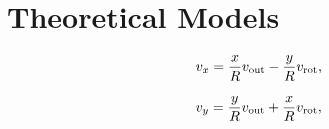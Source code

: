 \documentclass[a4paper,fleqn,usenatbib]{mnras}
\newcommand{\kms}{\ifmmode\mathrm{km\ s}^{-1}\else km s$^{-1}$\fi}
\newcommand{\vrot}{\ifmmode v_{\mathrm{rot}}\else $v_{\mathrm{rot}}$~\fi}
\newcommand{\vout}{\ifmmode v_{\mathrm{out}}\else $v_{\mathrm{out}}$~\fi}
\newcommand{\tauh}{\ifmmode \tau_{\mathrm{H}}\else $\tau_{\mathrm{H}}$~\fi}
\begin{document}



\section{Theoretical Models}
\label{sec:theory}



\begin{equation}
	v_{x}=\frac{x}{R}\vout - \frac{y}{R}\vrot ,
	\label{eq:vx}
\end{equation}

\begin{equation}
	v_{y}=\frac{y}{R}\vout + \frac{x}{R}\vrot ,
	\label{eq:vy}
\end{equation}
\end{document}
